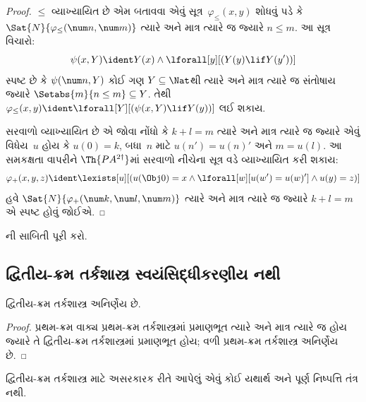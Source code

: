 \begin{proof}
$\le$ વ્યાખ્યાયિત છે એમ બતાવવા એવું સૂત્ર~$\varphi_\le(x, y)$ શોધવું
પડે કે $\Sat{N}{\varphi_\le(\num n, \num m)}$ ત્યારે અને માત્ર ત્યારે જ
જ્યારે $n \le m$. આ સૂત્ર વિચારો:
\[
\psi(x, Y) \ident Y(x) \land \lforall[y][(Y(y) \lif Y(y'))]
\]
સ્પષ્ટ છે કે $\psi(\num n, Y)$ કોઈ ગણ $Y \subseteq \Nat$થી ત્યારે
અને માત્ર ત્યારે જ સંતોષાય જ્યારે $\Setabs{m}{n \le m} \subseteq Y$.
તેથી $\varphi_\le(x, y) \ident
\lforall[Y][(\psi(x, Y) \lif Y(y))]$ લઈ શકાય.

સરવાળો વ્યાખ્યાયિત છે એ જોવા નોંધો કે $k+l=m$ ત્યારે અને માત્ર ત્યારે
જ જ્યારે એવું વિધેય~$u$ હોય કે $u(0)=k$, બધા~$n$ માટે
$u(n')=u(n)'$ અને $m = u(l)$. આ સમકક્ષતા વાપરીને
$\Th{PA^{2\dagger}}$માં સરવાળો નીચેના સૂત્ર વડે વ્યાખ્યાયિત કરી
શકાય:
\[
\varphi_+(x,y,z) \ident \lexists[u][(u(\Obj 0)=x \land \lforall[w][u(w')=u
 (w)'] \land u(y)=z)]
\]
હવે $\Sat{N}{\varphi_+(\num k, \num l, \num m)}$ ત્યારે અને માત્ર
ત્યારે જ જ્યારે $k+l=m$ એ સ્પષ્ટ હોવું જોઈએ.
\end{proof}

\begin{prob}
ની સાબિતી પૂરી કરો.
\end{prob}





\subsection{દ્વિતીય-ક્રમ તર્કશાસ્ત્ર સ્વયંસિદ્ધીકરણીય નથી}\label{sol:met:nax:sec}


\begin{thm}
દ્વિતીય-ક્રમ તર્કશાસ્ત્ર અનિર્ણેય છે.
\end{thm}

\begin{proof}
પ્રથમ-ક્રમ વાક્ય પ્રથમ-ક્રમ તર્કશાસ્ત્રમાં પ્રમાણભૂત ત્યારે
અને માત્ર ત્યારે જ હોય જ્યારે તે દ્વિતીય-ક્રમ તર્કશાસ્ત્રમાં
પ્રમાણભૂત હોય; વળી પ્રથમ-ક્રમ તર્કશાસ્ત્ર અનિર્ણેય છે.
\end{proof}

\begin{thm}
દ્વિતીય-ક્રમ તર્કશાસ્ત્ર માટે અસરકારક રીતે આપેલું એવું કોઈ યથાર્થ અને
પૂર્ણ નિષ્પત્તિ તંત્ર નથી.
\end{thm}

